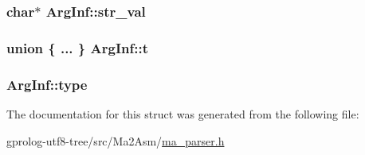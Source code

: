 \subsubsection[{\texorpdfstring{str\+\_\+val}{str_val}}]{\setlength{\rightskip}{0pt plus 5cm}char$\ast$ Arg\+Inf\+::str\+\_\+val}\hypertarget{structArgInf_aae189057e919a389c59d0ee897884c5f}{}\label{structArgInf_aae189057e919a389c59d0ee897884c5f}
\subsubsection[{\texorpdfstring{t}{t}}]{\setlength{\rightskip}{0pt plus 5cm}union \{ ... \} 
   Arg\+Inf\+::t}\hypertarget{structArgInf_ae7f40cf76bee98b10f0eb3d865b2b912}{}\label{structArgInf_ae7f40cf76bee98b10f0eb3d865b2b912}
\subsubsection[{\texorpdfstring{type}{type}}]{ Arg\+Inf\+::type}\hypertarget{structArgInf_ad416abaf87d2e52a23c4d2eb517919e4}{}\label{structArgInf_ad416abaf87d2e52a23c4d2eb517919e4}


The documentation for this struct was generated from the following file\+:\begin{DoxyCompactItemize}
\item 
gprolog-\/utf8-\/tree/src/\+Ma2\+Asm/\hyperlink{ma__parser_8h}{ma\+\_\+parser.\+h}\end{DoxyCompactItemize}
